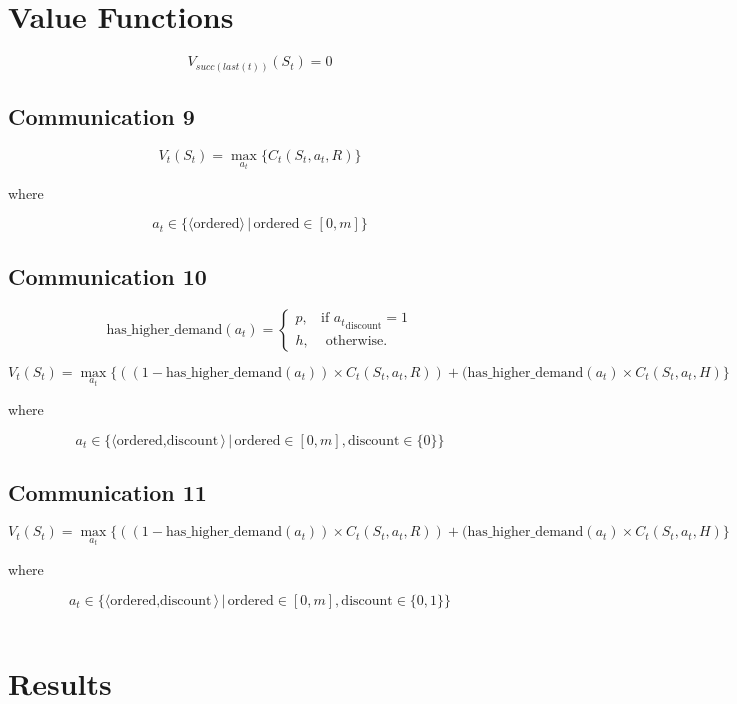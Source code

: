 \documentclass[a4paper]{article}
\newcommand{\SET}[1]{\{ {#1} \}}
\newcommand{\TUPLE}[1]{\langle {#1} \rangle}
\begin{document}
\newpage

\section*{Value Functions}

\[
V_{succ(last(t))}(S_t) =  0
\]

\subsection*{Communication 9}

\[
V_t(S_t) = \max_{a_t}\{ C_t(S_t, a_t, R) \}
\]

where 

\[a_t \in \{ \TUPLE{ \text{ordered} }  \,|\, \text{ordered} \in [0, m] \} \]


\subsection*{Communication 10}

\[
\text{has\_higher\_demand}(a_t) = \begin{cases}
        p, &\mbox{if } {a_t}_{\text{discount}} = 1\\
        h, &\mbox{ otherwise.} 
    \end{cases} 
\]

\[
V_t(S_t) = \max_{a_t}\{ ((1 - \text{has\_higher\_demand}(a_t)) \times C_t(S_t, a_t, R)) + (\text{has\_higher\_demand}(a_t) \times C_t(S_t, a_t, H)\}
\]

where 

\[a_t \in \{ \TUPLE{ \text{ordered}, \text{discount} }  \,|\, \text{ordered} \in [0, m], \text{discount} \in \SET{0} \} \]


\subsection*{Communication 11}

\[
V_t(S_t) = \max_{a_t}\{ ((1 - \text{has\_higher\_demand}(a_t)) \times C_t(S_t, a_t, R)) + (\text{has\_higher\_demand}(a_t) \times C_t(S_t, a_t, H)\}
\]

where

\[a_t \in \{ \TUPLE{ \text{ordered}, \text{discount} }  \,|\, \text{ordered} \in [0, m], \text{discount} \in \SET{0, 1} \} \]



\begin{tabular}{rl}
\end{tabular}



\newpage

\section*{Results}


\end{document}

